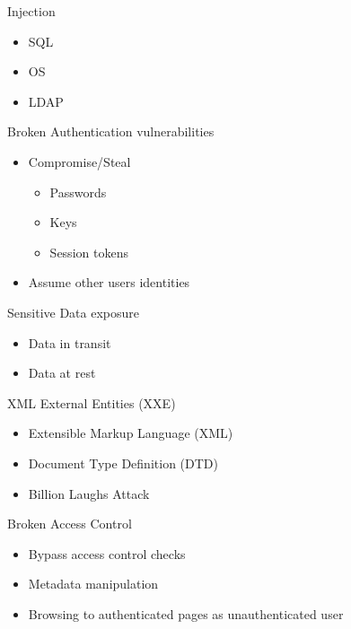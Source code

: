 \documentclass{curs}
\begin{document}
\begin{frame}{Injection}
  \begin{itemize}
    \item SQL 
    \item OS
    \item LDAP
  \end{itemize}
\end{frame}

\begin{frame}{Broken Authentication vulnerabilities}
  \begin{itemize}
    \item Compromise/Steal
      \begin{itemize}
        \item Passwords
        \item Keys
        \item Session tokens
      \end{itemize}
    \item Assume other users identities

  \end{itemize}
\end{frame}



\begin{frame}{Sensitive Data exposure}
  \begin{itemize}
    \item Data in transit
    \item Data at rest
  \end{itemize}
\end{frame}

\begin{frame}{XML External Entities (XXE)}
  \begin{itemize}
    \item Extensible Markup Language (XML)
    \item Document Type Definition (DTD)
    \item Billion Laughs Attack
  \end{itemize}
\end{frame}


\begin{frame}{Broken Access Control}
  \begin{itemize}
    \item Bypass access control checks
    \item Metadata manipulation
    \item Browsing to authenticated pages as unauthenticated user
  \end{itemize}
\end{frame}
\end{document}
